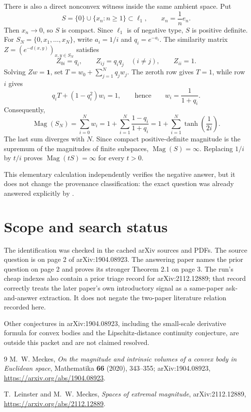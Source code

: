 \documentclass[11pt]{article}
\newcommand{\Mag}{\operatorname{Mag}}
\newcommand{\ellone}{\ell_1}
\begin{document}
There is also a direct nonconvex witness inside the same ambient space.  Put
\[
  S=\{0\}\cup\{x_n:n\geq 1\}\subset\ellone,
  \qquad x_n=\frac1n e_n.
\]
Then $x_n\to0$, so $S$ is compact.  Since $\ellone$ is of negative type,
$S$ is positive definite.  For
$S_N=\{0,x_1,\ldots,x_N\}$, write $a_i=1/i$ and $q_i=e^{-a_i}$.  The
similarity matrix $Z=(e^{-d(x,y)})_{x,y\in S_N}$ satisfies
\[
 Z_{0i}=q_i,\qquad Z_{ij}=q_iq_j\quad(i\ne j),\qquad Z_{ii}=1.
\]
Solving $Zw=\mathbf 1$, set
$T=w_0+\sum_{j=1}^Nq_jw_j$.  The zeroth row gives $T=1$, while row $i$
gives
\[
 q_iT+(1-q_i^2)w_i=1,
 \qquad\text{hence}\qquad w_i=\frac1{1+q_i}.
\]
Consequently,
\[
 \Mag(S_N)=\sum_{i=0}^N w_i
 =1+\sum_{i=1}^N\frac{1-q_i}{1+q_i}
 =1+\sum_{i=1}^N\tanh\!\left(\frac1{2i}\right).
\]
The last sum diverges with $N$.  Since compact positive-definite magnitude is
the supremum of the magnitudes of finite subspaces, $\Mag(S)=\infty$.
Replacing $1/i$ by $t/i$ proves $\Mag(tS)=\infty$ for every $t>0$.

This elementary calculation independently verifies the negative answer, but
it does not change the provenance classification: the exact question was
already answered explicitly by \cite{LeinsterMeckes2021}.

\section*{Scope and search status}

The identification was checked in the cached arXiv sources and PDFs.  The
source question is on page 2 of arXiv:1904.08923.  The answering paper names
the prior question on page 2 and proves its stronger Theorem 2.1 on page 3.
The run's cheap indexes also contain a prior triage record for arXiv:2112.12889;
that record correctly treats the later paper's own introductory signal as a
same-paper ask-and-answer extraction.  It does not negate the two-paper
literature relation recorded here.

Other conjectures in arXiv:1904.08923, including the small-scale derivative
formula for convex bodies and the Lipschitz-distance continuity conjecture,
are outside this packet and are not claimed resolved.

\begin{thebibliography}{9}
M.~W. Meckes,
\emph{On the magnitude and intrinsic volumes of a convex body in Euclidean
space}, Mathematika \textbf{66} (2020), 343--355;
arXiv:1904.08923,
\url{https://arxiv.org/abs/1904.08923}.

T.~Leinster and M.~W. Meckes,
\emph{Spaces of extremal magnitude},
arXiv:2112.12889,
\url{https://arxiv.org/abs/2112.12889}.
\end{thebibliography}
\end{document}
